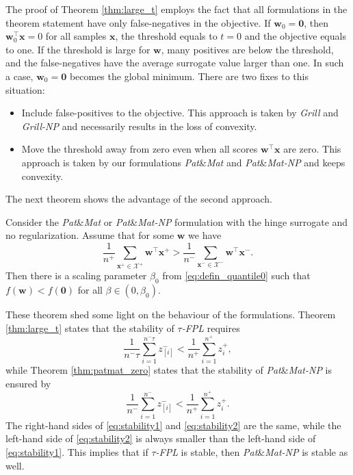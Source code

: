 \documentclass{Thesis}
\newcommand{\Xc}{\mathcal{X}}
\newcommand{\tauFPL}{{\emph{$\tau$-FPL}}\xspace}
\newcommand{\PatMat}{\emph{Pat}\&\emph{Mat}\xspace}
\newcommand{\PatMatNP}{{\emph{Pat}\&\emph{Mat-NP}}\xspace}
\newcommand{\Grill}{\emph{Grill}\xspace}
\newcommand{\GrillNP}{\emph{Grill-NP}\xspace}
\begin{document}
The proof of Theorem \ref{thm:large_t} employs the fact that all formulations in the theorem statement have only false-negatives in the objective. If $\bm{w}_0=\bm{0}$, then $\bm{w}_0^\top \bm{x}=0$ for all samples $\bm{x}$, the threshold equals to $t=0$ and the objective equals to one. If the threshold is large for $\bm{w}$, many positives are below the threshold, and the false-negatives have the average surrogate value larger than one. In such a case, $\bm{w}_0=\bm{0}$ becomes the global minimum. There are two fixes to this situation:
\begin{itemize}
  \item Include false-positives to the objective. This approach is taken by \Grill and \GrillNP and necessarily results in the loss of convexity.  \item Move the threshold away from zero even when all scores $\bm{w}^\top \bm{x}$ are zero. This approach is taken by our formulations \PatMat and \PatMatNP and keeps convexity.
\end{itemize}
The next theorem shows the advantage of the second approach.



\begin{theorem}\label{thm:patmat_zero}
  Consider the \PatMat or \PatMatNP formulation with the hinge surrogate and no regularization. Assume that for some $\bm{w}$ we have
  \begin{equation}\label{eq:patmat_zero}
    \frac{1}{n^+}\sum_{\bm{x}^+ \in \Xc^+}\bm{w}^\top \bm{x}^+ > \frac{1}{n^-}\sum_{\bm{x}^- \in \Xc^-}\bm{w}^\top \bm{x}^-.
  \end{equation}
  Then there is a scaling parameter $\beta_0$ from \eqref{eq:defin_quantile0} such that $f(\bm{w})<f(\bm{0})$ for all $\beta\in(0,\beta_0)$.
\end{theorem}

These theorem shed some light on the behaviour of the formulations. Theorem \ref{thm:large_t} states that the stability of \tauFPL requires
\begin{equation}\label{eq:stability1}
  \frac{1}{n^-\tau}\sum_{i=1}^{n^-\tau}z_{[i]}^- < \frac{1}{n^+}\sum_{i=1}^{n^+} z_{i}^+,
\end{equation}
while Theorem \ref{thm:patmat_zero} states that the stability of \PatMatNP is ensured by
\begin{equation}\label{eq:stability2}
  \frac{1}{n^-}\sum_{i=1}^{n^-}z_{[i]}^- < \frac{1}{n^+}\sum_{i=1}^{n^+} z_{i}^+.
\end{equation}
The right-hand sides of \eqref{eq:stability1} and \eqref{eq:stability2} are the same, while the left-hand side of \eqref{eq:stability2} is always smaller than the left-hand side of \eqref{eq:stability1}. This implies that if \tauFPL is stable, then \PatMatNP is stable as well.
\end{document}
